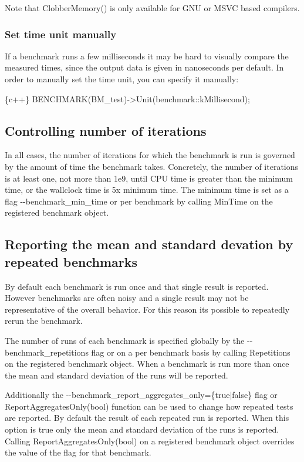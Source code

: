 Note that {\ttfamily Clobber\+Memory()} is only available for G\+NU or M\+S\+VC based compilers.

\subsubsection*{Set time unit manually}

If a benchmark runs a few milliseconds it may be hard to visually compare the measured times, since the output data is given in nanoseconds per default. In order to manually set the time unit, you can specify it manually\+:


\begin{DoxyCode}
\{c++\}
BENCHMARK(BM\_test)->Unit(benchmark::kMillisecond);
\end{DoxyCode}


\subsection*{Controlling number of iterations}

In all cases, the number of iterations for which the benchmark is run is governed by the amount of time the benchmark takes. Concretely, the number of iterations is at least one, not more than 1e9, until C\+PU time is greater than the minimum time, or the wallclock time is 5x minimum time. The minimum time is set as a flag {\ttfamily -\/-\/benchmark\+\_\+min\+\_\+time} or per benchmark by calling {\ttfamily Min\+Time} on the registered benchmark object.

\subsection*{Reporting the mean and standard devation by repeated benchmarks}

By default each benchmark is run once and that single result is reported. However benchmarks are often noisy and a single result may not be representative of the overall behavior. For this reason it\textquotesingle{}s possible to repeatedly rerun the benchmark.

The number of runs of each benchmark is specified globally by the {\ttfamily -\/-\/benchmark\+\_\+repetitions} flag or on a per benchmark basis by calling {\ttfamily Repetitions} on the registered benchmark object. When a benchmark is run more than once the mean and standard deviation of the runs will be reported.

Additionally the {\ttfamily -\/-\/benchmark\+\_\+report\+\_\+aggregates\+\_\+only=\{true$\vert$false\}} flag or {\ttfamily Report\+Aggregates\+Only(bool)} function can be used to change how repeated tests are reported. By default the result of each repeated run is reported. When this option is \textquotesingle{}true\textquotesingle{} only the mean and standard deviation of the runs is reported. Calling {\ttfamily Report\+Aggregates\+Only(bool)} on a registered benchmark object overrides the value of the flag for that benchmark.

